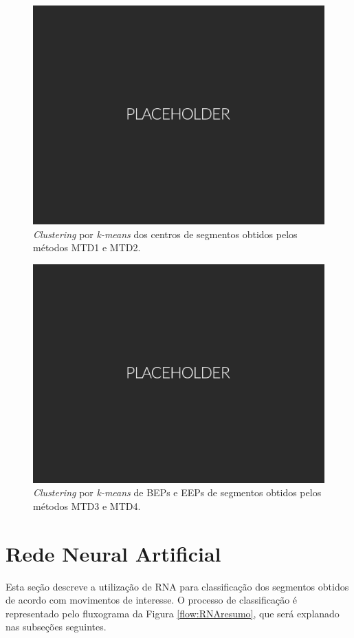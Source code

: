 \begin{figure}[htb]
	\caption{\label{fig:kmeans1}\emph{Clustering} por \emph{k-means} dos centros de segmentos obtidos pelos métodos MTD1 e MTD2.}
	\begin{center}
	    \includegraphics[width=0.75\linewidth]{./img/placeholder.png}
	\end{center}
\end{figure}

\begin{figure}[htb]
	\caption{\label{fig:kmeans2}\emph{Clustering} por \emph{k-means} de BEPs e EEPs de segmentos obtidos pelos métodos MTD3 e MTD4.}
	\begin{center}
	    \includegraphics[width=0.75\linewidth]{./img/placeholder.png}
	\end{center}
\end{figure}

		\section{Rede Neural Artificial}
Esta seção descreve a utilização de RNA para classificação dos segmentos obtidos de acordo com movimentos de interesse. O processo de classificação é representado pelo fluxograma da Figura \ref{flow:RNAresumo}, que será explanado nas subseções seguintes.

